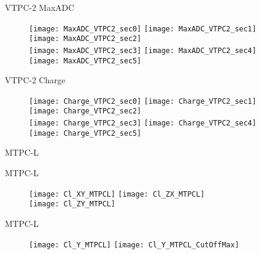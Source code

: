 \documentclass[11pt]{beamer}
\begin{document}
\begin{frame}{VTPC-2 MaxADC}
\begin{figure}
\centering
\texttt{[image: MaxADC\_VTPC2\_sec0]}
\texttt{[image: MaxADC\_VTPC2\_sec1]}
\texttt{[image: MaxADC\_VTPC2\_sec2]}\\
\texttt{[image: MaxADC\_VTPC2\_sec3]}
\texttt{[image: MaxADC\_VTPC2\_sec4]}
\texttt{[image: MaxADC\_VTPC2\_sec5]}
\end{figure}
\end{frame}

\begin{frame}{VTPC-2 Charge}
\begin{figure}
\centering
\texttt{[image: Charge\_VTPC2\_sec0]}
\texttt{[image: Charge\_VTPC2\_sec1]}
\texttt{[image: Charge\_VTPC2\_sec2]}\\
\texttt{[image: Charge\_VTPC2\_sec3]}
\texttt{[image: Charge\_VTPC2\_sec4]}
\texttt{[image: Charge\_VTPC2\_sec5]}
\end{figure}
\end{frame}

\begin{frame}
\centering
\Huge
MTPC-L
\end{frame}

\begin{frame}{MTPC-L}
\begin{figure}
\centering
\texttt{[image: Cl\_XY\_MTPCL]}
\texttt{[image: Cl\_ZX\_MTPCL]}\\
\texttt{[image: Cl\_ZY\_MTPCL]}
\end{figure}
\end{frame}

\begin{frame}{MTPC-L}
\begin{figure}
\centering
\texttt{[image: Cl\_Y\_MTPCL]}
\texttt{[image: Cl\_Y\_MTPCL\_CutOffMax]}
\end{figure}
\end{frame}
\end{document}
